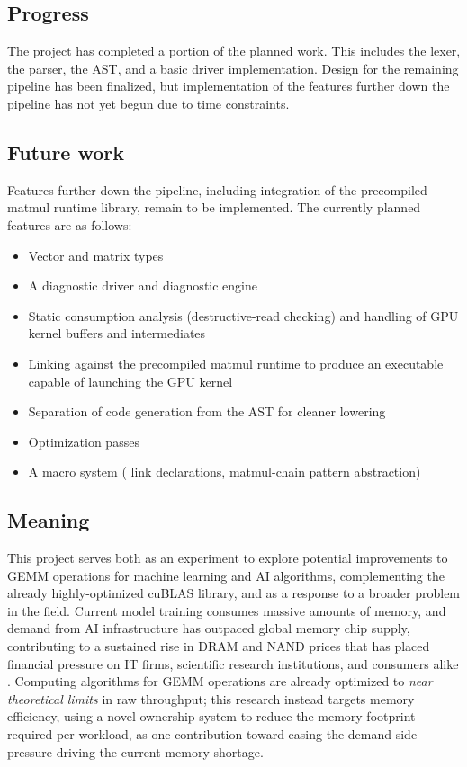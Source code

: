 \documentclass[a4paper]{article}
\begin{document}
	\subsection{Progress}
	The project has completed a portion of the planned work. This includes the lexer, the parser,
	the AST, and a basic driver implementation. Design for the remaining pipeline has been finalized,
	but implementation of the features further down the pipeline has not yet begun due to time constraints.

\subsection{Future work}
	Features further down the pipeline, including integration of the precompiled matmul runtime library,
	remain to be implemented. The currently planned features are as follows:
	\begin{itemize}
		\item Vector and matrix types
		\item A diagnostic driver and diagnostic engine
		\item Static consumption analysis (destructive-read checking) and handling of GPU kernel buffers and intermediates
		\item Linking against the precompiled matmul runtime to produce an executable capable of launching the GPU kernel
		\item Separation of code generation from the AST for cleaner lowering
		\item Optimization passes
		\item A macro system ( link declarations, matmul-chain pattern abstraction)
\end{itemize}

	\subsection{Meaning}
		This project serves both as an experiment to explore potential improvements to GEMM operations for
		machine learning and AI algorithms, complementing the already highly-optimized cuBLAS \cite{cublas} library, and
		as a response to a broader problem in the field. Current model training consumes massive amounts of
		memory, and demand from AI infrastructure has outpaced global memory chip supply, contributing to a
		sustained rise in DRAM and NAND prices that has placed financial pressure on IT firms, scientific
		research institutions, and consumers alike \cite{DRAM_PRICE}. 
		 Computing algorithms for GEMM operations are already
		optimized to \emph{near theoretical limits} in raw throughput; this research instead targets memory
		efficiency, using a novel ownership system to reduce the memory footprint required per workload,
		as one contribution toward easing the demand-side pressure driving the current memory shortage.
		
\end{document}
